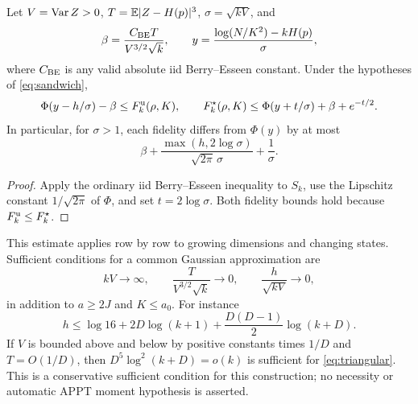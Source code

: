 \begin{corollary}\label{cor:berry}
Let $V=\operatorname{Var} Z>0$, $T=\mathbb E|Z-H(p)|^3$, $\sigma=\sqrt{kV}$, and
\[
 \beta=\frac{C_{\rm BE}T}{V^{3/2}\sqrt k},\qquad
 y=\frac{\log(N/K^2)-kH(p)}\sigma,
\]
where $C_{\rm BE}$ is any valid absolute iid Berry--Esseen constant. Under the hypotheses of \eqref{eq:sandwich},
\[
 \Phi(y-h/\sigma)-\beta\le F_k^{\rm u}(\rho,K),\qquad
 F_k^\star(\rho,K)\le\Phi(y+t/\sigma)+\beta+e^{-t/2}.
\]
In particular, for $\sigma>1$, each fidelity differs from $\Phi(y)$ by at most
\begin{equation}\label{eq:gaussian-error}
 \beta+\frac{\max(h,2\log\sigma)}{\sqrt{2\pi}\,\sigma}+\frac1\sigma.
\end{equation}
\end{corollary}
\begin{proof}
Apply the ordinary iid Berry--Esseen inequality \cite{shevtsova} to $S_k$, use the Lipschitz constant $1/\sqrt{2\pi}$ of $\Phi$, and set $t=2\log\sigma$. Both fidelity bounds hold because $F_k^{\rm u}\le F_k^\star$.
\end{proof}

This estimate applies row by row to growing dimensions and changing states. Sufficient conditions for a common Gaussian approximation are
\begin{equation}\label{eq:triangular}
 kV\to\infty,\qquad \frac{T}{V^{3/2}\sqrt k}\to0,\qquad
 \frac h{\sqrt{kV}}\to0,
\end{equation}
in addition to $a\ge2J$ and $K\le a_0$. For instance
\[
 h\le\log16+2D\log(k+1)+\frac{D(D-1)}2\log(k+D).
\]
If $V$ is bounded above and below by positive constants times $1/D$ and $T=O(1/D)$, then $D^5\log^2(k+D)=o(k)$ is sufficient for \eqref{eq:triangular}. This is a conservative sufficient condition for this construction; no necessity or automatic APPT moment hypothesis is asserted.
